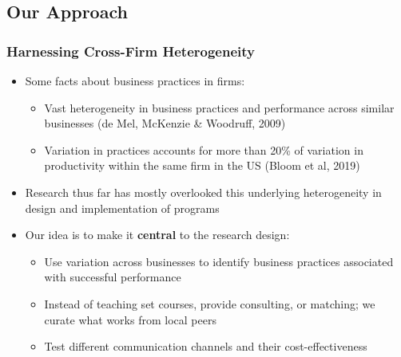 \documentclass[hideothersubsections, usenames,dvipsnames,10pt]{beamer}
\begin{document}
\subsection{Our Approach}
\begin{frame}
\frametitle{Harnessing Cross-Firm Heterogeneity}
\begin{itemize}
\item Some facts about business practices in firms:
	\begin{itemize}	
	\item Vast heterogeneity in business practices and performance across similar businesses (de Mel, McKenzie \& Woodruff, 2009)
	\item Variation in practices accounts for more than 20\% of variation in productivity within the same firm in the US (Bloom et al, 2019)
	\end{itemize}
\vspace{0.2in}
\pause
\item Research thus far has mostly overlooked this underlying heterogeneity in design and implementation of programs
\vspace{0.2in}
\pause
\item Our idea is to make it \textbf{central} to the research design: 
	\begin{itemize}
	\item Use variation across businesses to identify business practices associated with successful performance
	\item Instead of teaching set courses, provide consulting, or matching; we curate what works from local peers
	\item Test different communication channels and their cost-effectiveness
\end{itemize}
\end{itemize}

\end{frame}
\end{document}

